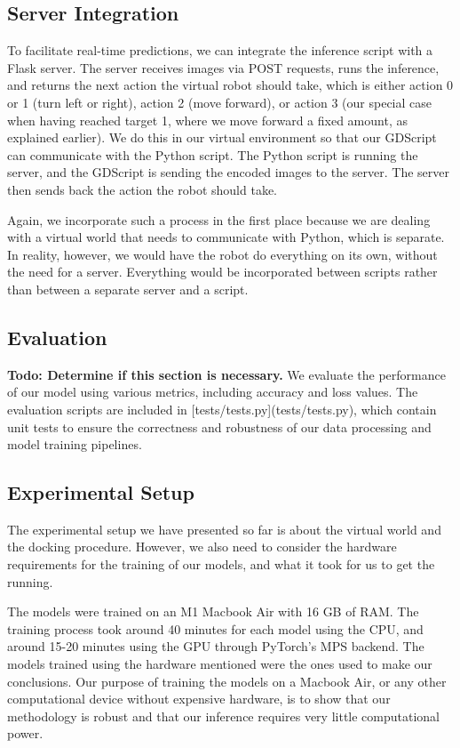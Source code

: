 \subsection{Server Integration}
To facilitate real-time predictions, we can integrate the inference script with a Flask server. The server receives images via POST requests, runs the inference, and returns the next action the virtual robot should take, which is either action 0 or 1 (turn left or right), action 2 (move forward), or action 3 (our special case when having reached target 1, where we move forward a fixed amount, as explained earlier). We do this in our virtual environment so that our GDScript can communicate with the Python script. The Python script is running the server, and the GDScript is sending the encoded images to the server. The server then sends back the action the robot should take.

Again, we incorporate such a process in the first place because we are dealing with a virtual world that needs to communicate with Python, which is separate. In reality, however, we would have the robot do everything on its own, without the need for a server. Everything would be incorporated between scripts rather than between a separate server and a script.

\subsection{Evaluation}
\textbf{Todo: Determine if this section is necessary.}
We evaluate the performance of our model using various metrics, including accuracy and loss values. The evaluation scripts are included in [tests/tests.py](tests/tests.py), which contain unit tests to ensure the correctness and robustness of our data processing and model training pipelines.

\subsection{Experimental Setup}
The experimental setup we have presented so far is about the virtual world and the docking procedure. However, we also need to consider the hardware requirements for the training of our models, and what it took for us to get the running.

The models were trained on an M1 Macbook Air with 16 GB of RAM. The training process took around 40 minutes for each model using the CPU, and around 15-20 minutes using the GPU through PyTorch's MPS backend. The models trained using the hardware mentioned were the ones used to make our conclusions. Our purpose of training the models on a Macbook Air, or any other computational device without expensive hardware, is to show that our methodology is robust and that our inference requires very little computational power.

